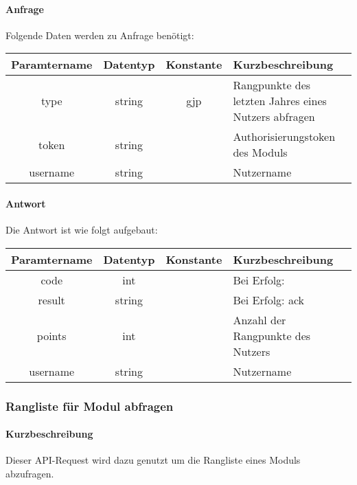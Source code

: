 \paragraph{Anfrage}Folgende Daten werden zu Anfrage benötigt:
\begin{table}[H]
	\begin{tabular}{|c|c|c|p{6.5cm}|}
		\hline
		\textbf{Paramtername} & \textbf{Datentyp} & \textbf{Konstante} & \textbf{Kurzbeschreibung}                                                                                               \\ \hline
		type                & string            & gjp                & Rangpunkte des letzten Jahres eines Nutzers abfragen\\ \hline
		token               & string            &                    & Authorisierungstoken des Moduls \\ \hline
		username            & string            &                    & Nutzername \\ \hline
	\end{tabular}
\end{table}
\paragraph{Antwort}Die Antwort ist wie folgt aufgebaut:
\begin{table}[H]
	\begin{tabular}{|c|c|c|p{6.5cm}|}
		\hline
		\textbf{Paramtername} & \textbf{Datentyp} & \textbf{Konstante} & \textbf{Kurzbeschreibung}            \\ \hline                
		code                & int              &                 & Bei Erfolg: {\glqq 0\grqq} \\ \hline
		result              & string           &                 & Bei Erfolg: {\glqq ack\grqq} \\ \hline
		points              & int              &                 & Anzahl der Rangpunkte des Nutzers \\ \hline
		username            & string           &                 & Nutzername \\ \hline
	\end{tabular}
\end{table}
\subsubsection{Rangliste für Modul abfragen}
\paragraph{Kurzbeschreibung}Dieser API-Request wird dazu genutzt um die Rangliste eines Moduls abzufragen.
